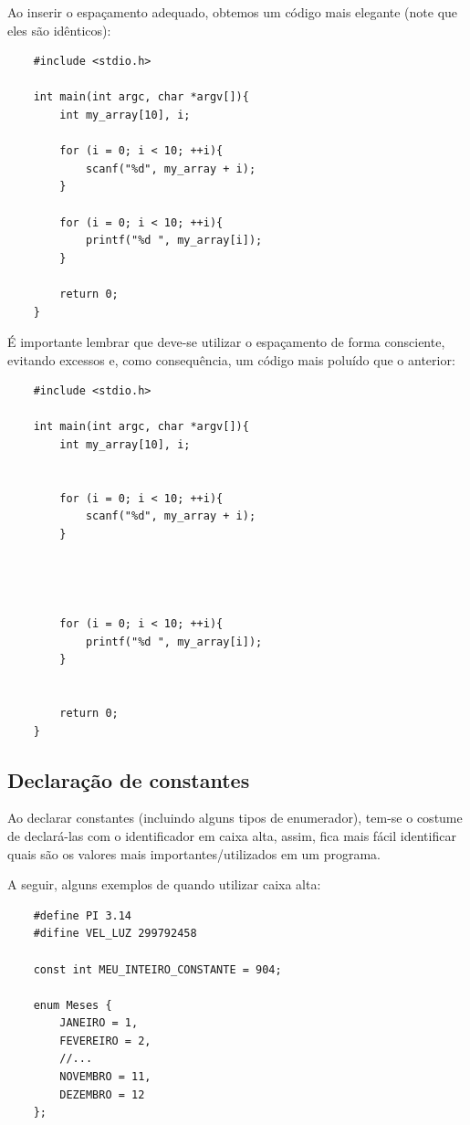 \documentclass[12pt]{article}
\newcommand\tab[1][1cm]{\hspace*{#1}}
\begin{document}
\par\tab Ao inserir o espaçamento adequado, obtemos um código mais elegante (note que eles são idênticos):

\hspace{0.25cm}
\begin{lstlisting}
    #include <stdio.h>
    
    int main(int argc, char *argv[]){
        int my_array[10], i;
        
        for (i = 0; i < 10; ++i){
            scanf("%d", my_array + i);
        }
        
        for (i = 0; i < 10; ++i){
            printf("%d ", my_array[i]);
        }
        
        return 0;
    }
\end{lstlisting}

\par\tab É importante lembrar que deve-se utilizar o espaçamento de forma consciente, evitando excessos e, como consequência, um código mais poluído que o anterior:

\hspace{0.25cm}
\begin{lstlisting}
    #include <stdio.h>
    
    int main(int argc, char *argv[]){
        int my_array[10], i;
        
        
        for (i = 0; i < 10; ++i){
            scanf("%d", my_array + i);
        }
        
        
        
        
        for (i = 0; i < 10; ++i){
            printf("%d ", my_array[i]);
        }
        
        
        return 0;
    }
\end{lstlisting}

\subsection{Declaração de constantes}

\par\tab Ao declarar constantes (incluindo alguns tipos de enumerador), tem-se o costume de declará-las com o identificador em caixa alta, assim, fica mais fácil identificar quais são os valores mais importantes/utilizados em um programa.

\par\tab A seguir, alguns exemplos de quando utilizar caixa alta:

\hspace{0.25cm}
\begin{lstlisting}
    #define PI 3.14
    #difine VEL_LUZ 299792458
    
    const int MEU_INTEIRO_CONSTANTE = 904;
    
    enum Meses {
        JANEIRO = 1,
        FEVEREIRO = 2,
        //...
        NOVEMBRO = 11,
        DEZEMBRO = 12
    };
\end{lstlisting}
\end{document}
